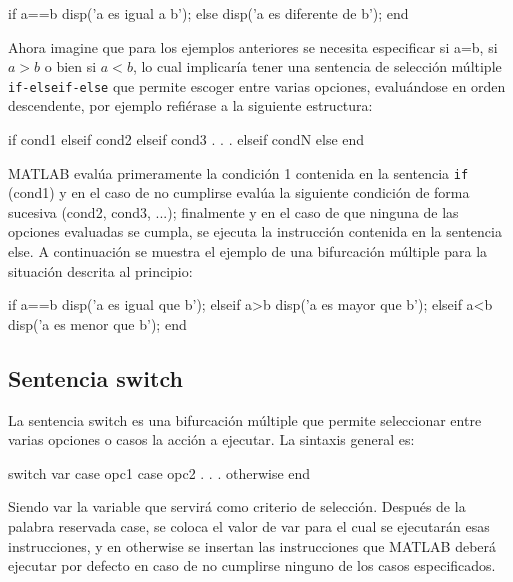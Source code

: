 \begin{matlab}
if a==b
    disp('a es igual a b');
else
    disp('a es diferente de b');
end
\end{matlab}

Ahora imagine que para los ejemplos anteriores se necesita especificar
si a=b, si $a > b$ o bien si $a < b$, lo cual
implicaría tener una sentencia de selección múltiple
\texttt{if-elseif-else} que permite escoger entre varias opciones,
evaluándose en orden descendente, por ejemplo refiérase a la siguiente
estructura:

\begin{matlab}
if cond1
elseif cond2 
elseif cond3
    .
    .
    .
elseif condN
else
end
\end{matlab}

MATLAB evalúa primeramente la condición 1 contenida en la sentencia
\texttt{if} (cond1) y en el caso de no cumplirse evalúa la siguiente
condición de forma sucesiva (cond2, cond3, ...); finalmente y en el
caso de que ninguna de las opciones evaluadas se cumpla, se ejecuta la
instrucción contenida en la sentencia else. A continuación se muestra el
ejemplo de una bifurcación múltiple para la situación descrita al
principio:

\begin{matlab}
if a==b
    disp('a es igual que b');
elseif a>b
    disp('a es mayor que b');
elseif a<b
    disp('a es menor que b');
end
\end{matlab}

\subsection{Sentencia switch}\label{sentencia-switch}

La sentencia switch es una bifurcación múltiple que permite seleccionar
entre varias opciones o casos la acción a ejecutar. La sintaxis general
es:

\begin{matlab}
switch var
   case opc1
   case opc2
    .
    .
    .
   otherwise
end
\end{matlab}

Siendo var la variable que servirá como criterio de selección. Después
de la palabra reservada case, se coloca el valor de var para el cual se
ejecutarán esas instrucciones, y en otherwise se insertan las
instrucciones que MATLAB deberá ejecutar por defecto en caso de no
cumplirse ninguno de los casos especificados. \\

